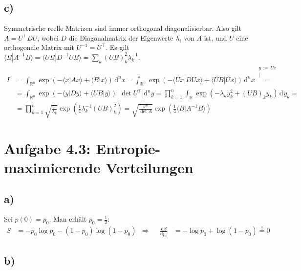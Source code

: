 \documentclass[a4paper,12pt]{article}
\newcommand{\kom}{}
\newcommand{\brak}{}
\newcommand{\intr}{}
\newcommand{\kla}{}
\newcommand{\tecxt}{}
\begin{document}
\subsection*{c)}Symmetrische reelle Matrizen sind immer orthogonal diagonalisierbar. Also gilt $A=U^\top DU$, wobei $D$ die Diagonalmatrix der Eigenwerte $\lambda_i$ von $A$ ist, und $U$ eine orthogonale Matrix mit $U^{-1}=U^\top$. Es gilt $\brak\langle {B}| {A^{-1}B}\rangle=\brak\langle {UB}| {D^{-1}UB}\rangle=\sum_k(UB)_k^2\lambda_k^{-1}$.
\begin{align*}
I&=\intr\int_{\mathbb{R}^{n}}\exp\kla\left( -\brak\langle {x}| {Ax}\rangle+\brak\langle {B}| {x}\rangle \right)\,\mathrm{d}^{n}x=\intr\int_{\mathbb{R}^{n}}\exp\kla\left( -\brak\langle {Ux}| {DUx}\rangle+\brak\langle {UB}| {Ux}\rangle \right)\,\mathrm{d}^{n}x\kom\overset{\substack{{y\,:=\,Ux} \\ |}}{=}\\
&=\intr\int_{\mathbb{R}^{n}}\exp\kla\left( -\brak\langle {y}| {Dy}\rangle+\brak\langle {UB}| {y}\rangle \right)\,|\det U^\top|\mathrm{d}^{n}y=\prod_{k=1}^n\intr\int_{\mathbb{R}^{ }}\exp\kla\left( -\lambda_ky_k^2+(UB)_ky_k \right)\,\mathrm{d}^{ }y_k=\\
&=\prod_{k=1}^n\sqrt{\frac{\pi}{\lambda_k}}\exp\kla\left( {{\frac{1}{4}\lambda_k^{-1}(UB)_k^2}} \right)=\sqrt{\frac{\pi^n}{\det A}}\exp\kla\left( {\frac{1}{4}\brak\langle {B}| {A^{-1}B}\rangle} \right)
\end{align*}
\section*{Aufgabe 4.3: Entropie-maximierende Verteilungen}
\subsection*{a)}Sei $p(0)=p_0$. Man erhält $p_0=\frac{1}{2}$:
\begin{align*}
S&=-p_0\log p_0-(1-p_0)\log(1-p_0)&\Rightarrow &&\frac{\tecxt\text{d}S}{\tecxt\text{d}p_0}&=-\log p_0+\log(1-p_0)\overset{!}{=}0
\end{align*}
\subsection*{b)}
\end{document}
